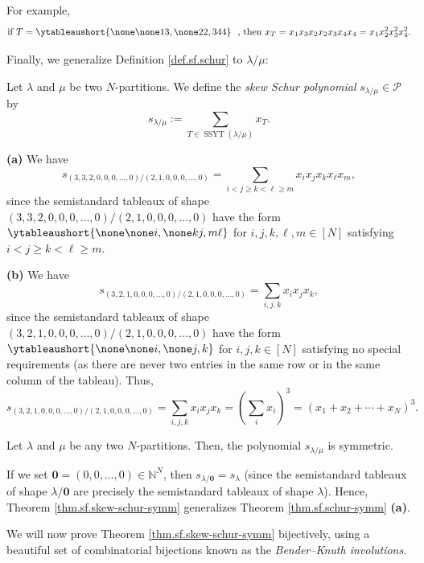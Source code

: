 For example,%
\[
\text{if }T=\ytableaushort{\none\none 13,\none 22,344}\ \ \text{, then }%
x_{T}=x_{1}x_{3}x_{2}x_{2}x_{3}x_{4}x_{4}=x_{1}x_{2}^{2}x_{3}^{2}x_{4}^{2}.
\]


Finally, we generalize Definition \ref{def.sf.schur} to $\lambda/\mu$:

\begin{definition}
\label{def.sf.skew-schur}Let $\lambda$ and $\mu$ be two $N$-partitions. We
define the \emph{skew Schur polynomial} $s_{\lambda/\mu}\in\mathcal{P}$ by%
\[
s_{\lambda/\mu}:=\sum_{T\in\operatorname*{SSYT}\left(  \lambda/\mu\right)
}x_{T}.
\]

\end{definition}

\begin{example}
\textbf{(a)} We have%
\[
s_{\left(  3,3,2,0,0,0,\ldots,0\right)  /\left(  2,1,0,0,0,\ldots,0\right)
}=\sum_{i<j\geq k<\ell\geq m}x_{i}x_{j}x_{k}x_{\ell}x_{m},
\]
since the semistandard tableaux of shape $\left(  3,3,2,0,0,0,\ldots,0\right)
/\left(  2,1,0,0,0,\ldots,0\right)  $ have the form
$\ytableaushort{\none\none i,\none kj,m\ell}$ for $i,j,k,\ell,m\in\left[
N\right]  $ satisfying $i<j\geq k<\ell\geq m$. \medskip

\textbf{(b)} We have%
\[
s_{\left(  3,2,1,0,0,0,\ldots,0\right)  /\left(  2,1,0,0,0,\ldots,0\right)
}=\sum_{i,j,k}x_{i}x_{j}x_{k},
\]
since the semistandard tableaux of shape $\left(  3,2,1,0,0,0,\ldots,0\right)
/\left(  2,1,0,0,0,\ldots,0\right)  $ have the form
$\ytableaushort{\none\none i,\none j,k}$ for $i,j,k\in\left[  N\right]  $
satisfying no special requirements (as there are never two entries in the same
row or in the same column of the tableau). Thus,%
\[
s_{\left(  3,2,1,0,0,0,\ldots,0\right)  /\left(  2,1,0,0,0,\ldots,0\right)
}=\sum_{i,j,k}x_{i}x_{j}x_{k}=\left(  \sum_{i}x_{i}\right)  ^{3}=\left(
x_{1}+x_{2}+\cdots+x_{N}\right)  ^{3}.
\]

\end{example}

\begin{theorem}
\label{thm.sf.skew-schur-symm}Let $\lambda$ and $\mu$ be any two
$N$-partitions. Then, the polynomial $s_{\lambda/\mu}$ is symmetric.
\end{theorem}

\begin{remark}
\label{rmk.sf.skew-0}If we set $\mathbf{0}=\left(  0,0,\ldots,0\right)
\in\mathbb{N}^{N}$, then $s_{\lambda/\mathbf{0}}=s_{\lambda}$ (since the
semistandard tableaux of shape $\lambda/\mathbf{0}$ are precisely the
semistandard tableaux of shape $\lambda$). Hence, Theorem
\ref{thm.sf.skew-schur-symm} generalizes Theorem \ref{thm.sf.schur-symm}
\textbf{(a)}.
\end{remark}

We will now prove Theorem \ref{thm.sf.skew-schur-symm} bijectively, using a
beautiful set of combinatorial bijections known as the \emph{Bender--Knuth
involutions}.

